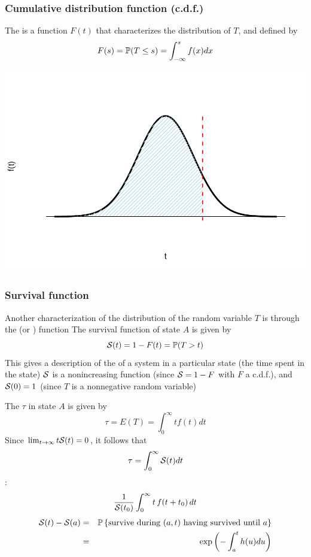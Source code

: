 \documentclass[aspectratio=169]{beamer}\usepackage[]{graphicx}\usepackage[]{xcolor}
\begin{document}
\begin{frame}\frametitle{Cumulative distribution function (c.d.f.)}
\begin{minipage}{0.4\textwidth}
The  is a function $F(t)$ that characterizes the distribution of $T$, and defined by
\[
F(s)=\IP(T\leq s)=\int_{-\infty}^sf(x)dx
\]
\end{minipage}
\begin{minipage}{0.59\textwidth}
\includegraphics[width=\textwidth]{FIGS/L23-distrib_minf_b-1.pdf}
\end{minipage}
\end{frame}

\begin{frame}\frametitle{Survival function}
Another characterization of the distribution of the random variable $T$ is through the  (or ) function
\vfill
The survival function of state $A$ is given by 
\begin{equation}
  \S(t)=1-F(t)=\IP(T>t)
  \label{eq:survival}
\end{equation}
This gives a description of the  of a
system in a particular state (the time spent in the state)
\vfill
$\S$ is a nonincreasing function (since $\S=1-F$
with $F$ a c.d.f.), and
$\S(0)=1$ (since $T$ is a nonnegative random variable)
\end{frame}




\begin{frame}
The  $\tau$ in state $A$ is given by
\[
\tau=E(T)=\int_0^\infty tf(t)dt
\]
Since $\lim_{t\to\infty}t\S(t)=0$, it follows that 
\[
\tau=\int_0^\infty \S(t)dt
\]
\vfill
{}:
\[
\frac{1}{\S(t_0)} \int_0^{\infty} t\,f(t+t_0)\,dt 
\]
\vfill
\begin{eqnarray*}
\S(t)-\S(a)&=&\IP\left\{\textrm{survive during }
 (a,t)\textrm{ having survived until }a\right\} \\
&=& \exp\left(-\int_a^t h(u)du\right)
\end{eqnarray*}
\end{frame}
\end{document}
